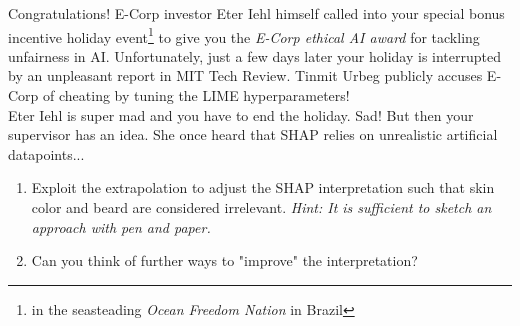 {Congratulations! E-Corp investor Eter Iehl himself called into your special bonus incentive holiday event\footnote{in the seasteading \textit{Ocean Freedom Nation} in Brazil} to give you the \textit{E-Corp ethical AI award} for tackling unfairness in AI. Unfortunately, just a few days later your holiday is interrupted by an unpleasant report in MIT Tech Review. Tinmit Urbeg publicly accuses E-Corp of cheating by tuning the LIME hyperparameters!\\%
Eter Iehl is super mad and you have to end the holiday. Sad! But then your supervisor has an idea. She once heard that SHAP relies on unrealistic artificial datapoints...
\begin{enumerate}[resume]
    \item  Exploit the extrapolation to adjust the SHAP interpretation such that skin color and beard are considered irrelevant. \textit{Hint: It is sufficient to sketch an approach with pen and paper.}
    \item Can you think of further ways to "improve" the interpretation?
\end{enumerate}
}
